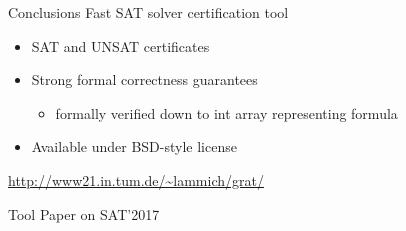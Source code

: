 \documentclass[fleqn]{beamer}
\begin{document}
\begin{frame}{Conclusions}
  Fast SAT solver certification tool
  \begin{itemize}
   \item SAT and UNSAT certificates
   \item Strong formal correctness guarantees
    \begin{itemize}
     \item formally verified down to int array representing formula
    \end{itemize}
   \item Available under BSD-style license
    
  \end{itemize}
  \vfill 
  \center \url{http://www21.in.tum.de/~lammich/grat/}
    
  \vfill
  Tool Paper on SAT'2017
    
    
    
%   
%     
    
    
\end{frame}
\end{document}
